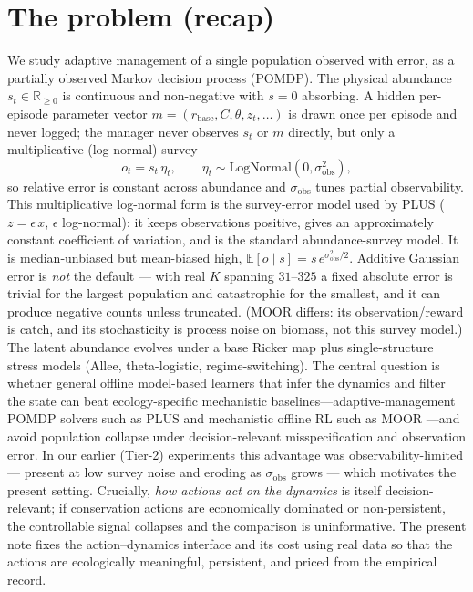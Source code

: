 \documentclass[11pt]{article}
\newcommand{\rbase}{r_{\mathrm{base}}}
\newcommand{\sobs}{\sigma_{\mathrm{obs}}}
\begin{document}
\section{The problem (recap)}
We study adaptive management of a single population observed with error, as a
partially observed Markov decision process (POMDP). The physical abundance
$s_t\in\mathbb{R}_{\ge 0}$ is continuous and non-negative with $s{=}0$ absorbing.
A hidden per-episode parameter vector $m=(\rbase,C,\theta,z_t,\dots)$ is drawn once
per episode and never logged; the manager never observes $s_t$ or $m$ directly, but
only a multiplicative (log-normal) survey
\begin{equation}
o_t=s_t\,\eta_t,\qquad \eta_t\sim\mathrm{LogNormal}(0,\sobs^2),
\end{equation}
so relative error is constant across abundance and $\sobs$ tunes partial
observability. This multiplicative log-normal form is the survey-error model used by
PLUS \cite{memarzadeh2018} ($z{=}\epsilon\,x$, $\epsilon$ log-normal): it keeps
observations positive, gives an approximately constant coefficient of variation, and is
the standard abundance-survey model. It is median-unbiased but mean-biased high,
$\mathbb{E}[o\mid s]{=}s\,e^{\sobs^2/2}$. Additive Gaussian error is \emph{not} the
default --- with real $K$ spanning $31$--$325$ a fixed absolute error is trivial for
the largest population and catastrophic for the smallest, and it can produce negative
counts unless truncated. (MOOR \cite{ju2025} differs: its observation/reward is catch,
and its stochasticity is process noise on biomass, not this survey model.) The latent abundance evolves under a base Ricker map
\cite{ricker1954} plus single-structure stress models (Allee, theta-logistic,
regime-switching). The central question is whether general offline model-based
learners that infer the dynamics and filter the state can beat ecology-specific
mechanistic baselines---adaptive-management POMDP solvers such as PLUS
\cite{memarzadeh2018} and mechanistic offline RL such as MOOR \cite{ju2025}---and
avoid population collapse under decision-relevant misspecification and observation
error. In our earlier (Tier-2) experiments this advantage was observability-limited
--- present at low survey noise and eroding as $\sobs$ grows --- which motivates the present setting. Crucially, \emph{how
actions act on the dynamics} is itself decision-relevant; if conservation actions
are economically dominated or non-persistent, the controllable signal collapses
and the comparison is uninformative. The present note fixes the action--dynamics
interface and its cost using real data so that the actions are ecologically
meaningful, persistent, and priced from the empirical record.
\end{document}
